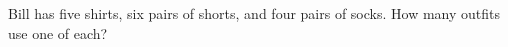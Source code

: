 Bill has five shirts, six pairs of shorts, and four pairs of socks. How many outfits use one of each?
